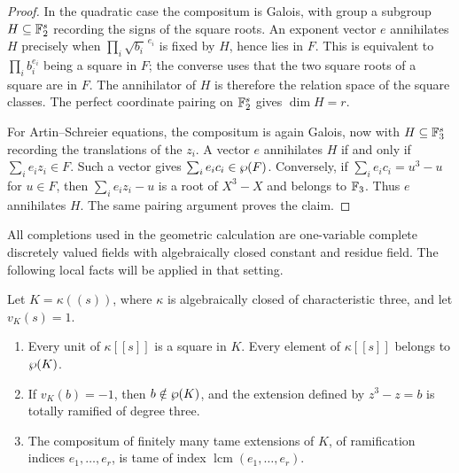 \begin{proof}
In the quadratic case the compositum is Galois, with group a subgroup
$H\subseteq\mathbb{F}_2^s$ recording the signs of the square roots.
An exponent vector $e$ annihilates $H$ precisely when
$\prod_i\sqrt{b_i}^{\,e_i}$ is fixed by $H$, hence lies in $F$.
This is equivalent to $\prod_i b_i^{e_i}$ being a square in $F$;
the converse uses that the two square roots of a square are in $F$.
The annihilator of $H$ is therefore the relation space of the square
classes. The perfect coordinate pairing on $\mathbb{F}_2^s$ gives
$\dim H=r$.

For Artin--Schreier equations, the compositum is again Galois, now
with $H\subseteq\mathbb{F}_3^s$ recording the translations of the $z_i$.
A vector $e$ annihilates $H$ if and only if $\sum_i e_i z_i\in F$.
Such a vector gives $\sum_i e_i c_i\in\wp(F)$. Conversely,
if $\sum_i e_i c_i=u^3-u$ for $u\in F$, then
$\sum_i e_i z_i-u$ is a root of $X^3-X$ and belongs to $\mathbb{F}_3$.
Thus $e$ annihilates $H$. The same pairing argument proves the claim.
\end{proof}

All completions used in the geometric calculation are one-variable
complete discretely valued fields with algebraically closed constant
and residue field. The following local facts will be applied in that
setting.

\begin{lemma}\label{lem:local}
Let $K=\kappa((s))$, where $\kappa$ is algebraically closed of
characteristic three, and let $v_K(s)=1$.
\begin{enumerate}
\item Every unit of $\kappa[[s]]$ is a square in $K$. Every element
of $\kappa[[s]]$ belongs to $\wp(K)$.
\item If $v_K(b)=-1$, then $b\notin\wp(K)$, and the extension
defined by $z^3-z=b$ is totally ramified of degree three.
\item The compositum of finitely many tame extensions of $K$, of
ramification indices $e_1,\ldots,e_r$, is tame of index
$\operatorname{lcm}(e_1,\ldots,e_r)$.
\end{enumerate}
\end{lemma}

